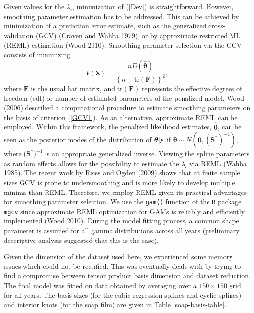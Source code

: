 \documentclass[10pt]{article}
\newcommand{\beq}{\begin{equation}}
\newcommand{\eeq}{\end{equation}}
\theoremstyle{definition}
\theoremstyle{plain}
\begin{document}
Given values for the $\lambda_i$, minimization of (\ref{Dev}) is straightforward. However, smoothing parameter estimation has to be addressed. This can be achieved by minimization of a prediction error estimate, such as the generalized cross-validation (GCV) (Craven and Wahba 1979), or by approximate restricted ML (REML) estimation (Wood 2010). Smoothing parameter selection via the GCV consists of minimizing 
\beq
V(\bm\lambda)=\frac{nD(\hat{\bm\theta})}{\left\{n-\text{tr}(\textbf{F})\right\}^2},
\label{GCV1}
\eeq
where $\textbf{F}$ is the usual hat matrix, and $\text{tr}(\textbf{F})$ represents the effective degrees of freedom (edf) or number of estimated parameters of the penalized model. Wood (2006) described a computational procedure to estimate smoothing parameters on the basis of criterion (\ref{GCV1}). As an alternative, approximate REML can be employed. Within this framework, the penalized likelihood estimates, $\hat{\bm\theta}$, can be seen as the posterior modes of the distribution of $\bm\theta|{\bf y}$ if $\bm\theta \sim N(\textbf{0},(\textbf{S}^*)^{-1})$, where ($\textbf{S}^*)^{-1}$ is an appropriate generalized inverse. Viewing the spline parameters as random effects allows for the possibility to estimate the $\lambda_i$ via REML (Wahba 1985). The recent work by Reiss and Ogden (2009) shows that at finite sample sizes GCV is prone to undersmoothing and is more likely to develop multiple minima than REML. Therefore, we employ REML given its practical advantages for smoothing parameter selection. We use the \texttt{gam()} function of the \texttt{R} package \texttt{mgcv} since approximate REML optimization for GAMs is reliably and efficiently implemented (Wood 2010). During the model fitting process, a common shape parameter is assumed for all gamma distributions across all years (preliminary descriptive analysis suggested that this is the case).

Given the dimension of the dataset used here, we experienced some memory issues which could not be rectified. This was eventually dealt with by trying to find a compromise between tensor product basis dimension and dataset reduction. The final model was fitted on data obtained by averaging over a $150\times150$ grid for all years. The basis sizes (for the cubic regression splines and cyclic splines) and interior knots (for the soap film) are given in Table \ref{soap-basis-table}.
\end{document}
